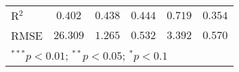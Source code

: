 \begin{table}
\begin{center}
\begin{tabular}{l c c c c c}
R$^{2}$                                                                          & $0.402$         & $0.438$                      & $0.444$        & $0.719$                       & $0.354$        \\
RMSE                                                                             & $26.309$        & $1.265$                      & $0.532$        & $3.392$                       & $0.570$        \\
\hline
\multicolumn{6}{l}{\scriptsize{$^{***}p<0.01$; $^{**}p<0.05$; $^{*}p<0.1$}}
\end{tabular}
\caption{}
\label{table:SI_table17_cw_het_A}
\end{center}
\end{table}
